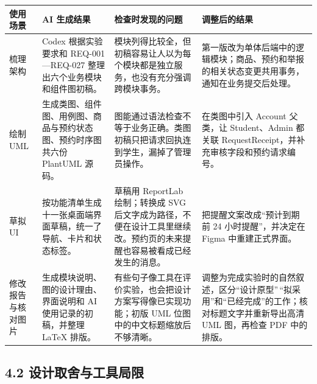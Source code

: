\documentclass[
  chinese,
  10pt,
  a4paper,
]{article}
\newcounter{none} %
\begin{document}
{\def\LTcaptype{none} %
\begin{longtable}[]{@{}
  >{\raggedright\arraybackslash}p{}
  >{\raggedright\arraybackslash}p{}
  >{\raggedright\arraybackslash}p{}
  >{\raggedright\arraybackslash}p{}@{}}
\toprule\noalign{}
\begin{minipage}[b]{\linewidth}\raggedright
使用场景
\end{minipage} & \begin{minipage}[b]{\linewidth}\raggedright
AI 生成结果
\end{minipage} & \begin{minipage}[b]{\linewidth}\raggedright
检查时发现的问题
\end{minipage} & \begin{minipage}[b]{\linewidth}\raggedright
调整后的结果
\end{minipage} \\
\midrule\noalign{}
\endhead
\bottomrule\noalign{}
\endlastfoot
梳理架构 & Codex 根据实验要求和 REQ-001---REQ-027
整理出六个业务模块和组件图初稿。 &
模块列得比较全，但初稿容易让人以为每个模块都是独立服务，也没有充分强调跨模块事务。
&
第一版改为单体后端中的逻辑模块；商品、预约和举报的相关状态变更共用事务，通知在业务提交后处理。 \\
绘制 UML & 生成类图、组件图、用例图、商品与预约状态图、预约时序图共六份
PlantUML 源码。 &
图能通过语法检查不等于业务正确。类图初稿只把请求回执连到学生，漏掉了管理员操作。
& 在类图中引入 Account 父类，让 Student、Admin 都关联
RequestReceipt，并补充审核字段和预约请求编号。 \\
草拟 UI &
按功能清单生成十一张桌面端界面草稿，统一了导航、卡片和状态标签。 &
草稿用 ReportLab 绘制；转换成 SVG
后文字成为路径，不便在设计工具里继续改。预约页的未来提醒也容易被看成已经发生的消息。
& 把提醒文案改成``预计到期前 24 小时提醒''，并决定在 Figma
中重建正式界面。 \\
修改报告与核对图片 & 生成模块说明、图的设计理由、界面说明和 AI
使用记录的初稿，并整理 LaTeX 排版。 &
有些句子像工具在评价实验，也会把设计方案写得像已实现功能；初版 UML
位图中的中文标题缩放后不够清晰。 &
调整为完成实验时的自然叙述，区分``设计原型''\,``拟采用''和``已经完成''的工作；核对标题文字并重新导出高清
UML 图，再检查 PDF 中的排版。 \\
\end{longtable}
}

\subsection{4.2
设计取舍与工具局限}\label{ux8bbeux8ba1ux53d6ux820dux4e0eux5de5ux5177ux5c40ux9650}
\end{document}
